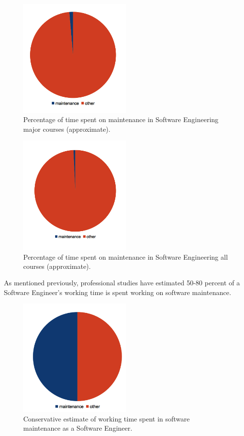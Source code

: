 \documentclass[11pt]{article}
\begin{document}
\begin{multicols}{2}
\begin{figure}[tbp!]
  \caption{Percentage of time spent on maintenance in Software Engineering major courses (approximate).}
  \centering
    \includegraphics[width=0.5\textwidth]{termpaper/images/pie-chart-02}
\end{figure}

\begin{figure}[tbp!]
  \caption{Percentage of time spent on maintenance in Software Engineering all courses (approximate).}
  \centering
    \includegraphics[width=0.5\textwidth]{termpaper/images/pie-chart-03}
\end{figure}

As mentioned previously, professional studies have estimated 50-80 percent of a Software Engineer's working time is spent working on software maintenance. \cite{stark97} \cite{parekh}

\begin{figure}[tbp!]
  \caption{Conservative estimate of working time spent in software maintenance as a Software Engineer.}
  \centering
    \includegraphics[width=0.5\textwidth]{termpaper/images/pie-chart-04}
\end{figure}


\end{multicols}
\end{document}
